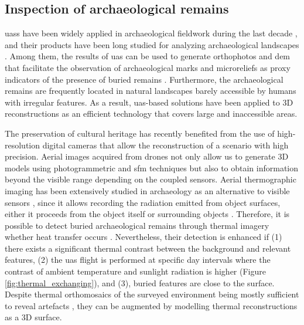 \subsection{Inspection of archaeological remains}

\acrshort{uas}s have been widely applied in archaeological fieldwork during the last decade \cite{campana_drones_2017}, and their products have been long studied for analyzing archaeological landscapes \cite{waagen_new_2019}. Among them, the results of \acrshort{uas} can be used to generate orthophotos and \acrshort{dem} that facilitate the observation of archaeological marks and microreliefs as proxy indicators of the presence of buried remains \cite{pecci_archaeology_2016, dubbini_digital_2016}. Furthermore, the archaeological remains are frequently located in natural landscapes barely accessible by humans with irregular features. As a result, \acrshort{uas}-based solutions have been applied to 3D reconstructions as an efficient technology that covers large and inaccessible areas. 

The preservation of cultural heritage has recently benefited from the use of high-resolution digital cameras that allow the reconstruction of a scenario with high precision. Aerial images acquired from drones not only allow us to generate 3D models using photogrammetric and \acrshort{sfm} techniques but also to obtain information beyond the visible range depending on the coupled sensors. Aerial thermographic imaging has been extensively studied in archaeology as an alternative to visible sensors \cite{casana_archaeological_2017, brooke_thermal_2018, mcleester_detecting_2018, salgado_carmona_assessing_2020}, since it allows recording the radiation emitted from object surfaces, either it proceeds from the object itself or surrounding objects \cite{vollmer_infrared_2017}. Therefore, it is possible to detect buried archaeological remains through thermal imagery whether heat transfer occurs \cite{casana_archaeological_2017}. Nevertheless, their detection is enhanced if (1) there exists a significant thermal contrast between the background and relevant features, (2) the \acrshort{uas} flight is performed at specific day intervals where the contrast of ambient temperature and sunlight radiation is higher (Figure \ref{fig:thermal_exchanging}), and (3), buried features are close to the surface. Despite thermal orthomosaics of the surveyed environment being mostly sufficient to reveal artefacts \cite{mcleester_detecting_2018, salgado_carmona_assessing_2020}, they can be augmented by modelling thermal reconstructions as a 3D surface. 


